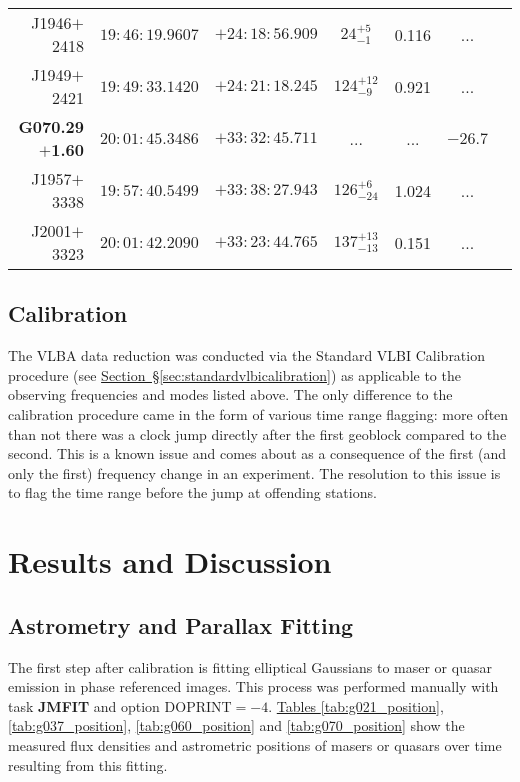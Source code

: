 \begin{table}[h]
\begin{tabular}{rcccccc}
					J1946$+$2418     & $19:46:19.9607$ & $+24:18:56.909$ & $24^{+5}_{-1}$       & 0.116 &  ...   &       \\
					J1949$+$2421     & $19:49:33.1420$ & $+24:21:18.245$ & $124^{+12}_{-9}$     & 0.921 &  ...   &       \\\hline 
					\textbf{G070.29$+$1.60}  & $20:01:45.3486$ & $+33:32:45.711$ & ...                  & ...   &$-26.7$ & \water\\
					J1957$+$3338     & $19:57:40.5499$ & $+33:38:27.943$ & $126^{+6}_{-24}$     & 1.024 &  ...   &       \\
					J2001$+$3323     & $20:01:42.2090$ & $+33:23:44.765$ & $137^{+13}_{-13}$    & 0.151 &  ...   &       \\
					\bottomrule
				\end{tabular}
				\vspace{0.5cm}
			\end{table}
        
        
        \subsection{Calibration}
		    The VLBA data reduction was conducted via the Standard VLBI Calibration procedure (see \hyperref[{sec:standardvlbicalibration}]{Section~\S \ref*{sec:standardvlbicalibration}}) as applicable to the observing frequencies and modes listed above. The only difference to the calibration procedure came in the form of various time range flagging: more often than not there was a clock jump directly after the first geoblock compared to the second. This is a known issue and comes about as a consequence of the first (and only the first) frequency change in an experiment. The resolution to this issue is to flag the time range before the jump at offending stations.
	
	\clearpage
    \section{Results and Discussion}    
        \subsection{Astrometry and Parallax Fitting}
	        The first step after calibration is fitting elliptical Gaussians to maser or quasar emission in phase referenced images. This process was performed manually with \aips\space task \textbf{JMFIT} and option DOPRINT$=-4$. \hyperref[tab:g021_position]{Tables \ref*{tab:g021_position}}, \hyperref[tab:g037_position]{\ref*{tab:g037_position}},  \hyperref[tab:g060_position]{\ref*{tab:g060_position}} and  \hyperref[tab:g070_position]{\ref*{tab:g070_position}} show the measured flux densities and astrometric positions of masers or quasars over time resulting from this fitting.
	        
